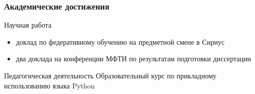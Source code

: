 \begin{frame}
    \frametitle{Академические достижения}
    \begin{block}{Научная работа}
        \begin{itemize}
            \item доклад по федеративному обучению на предметной смене в Сириус
            \item два доклада на конференции МФТИ по результатам подготовки диссертации 
        \end{itemize}
    \end{block}
    \begin{block}{Педагогическая деятельность}
        Образовательный курс по прикладному использованию языка Python
    \end{block}
\end{frame}